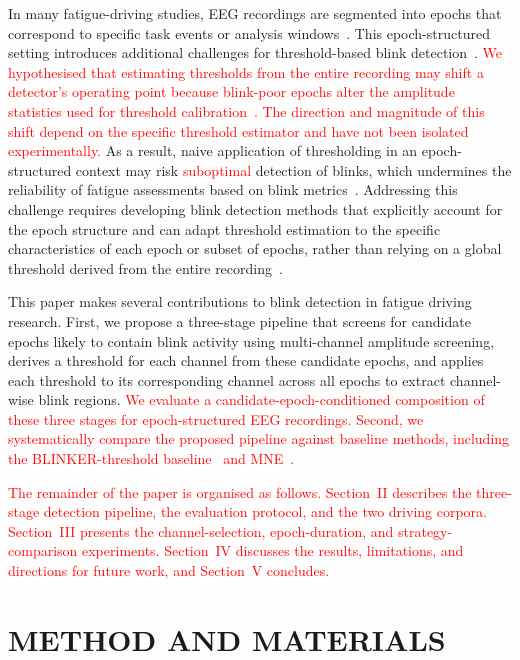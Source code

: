 \documentclass[journal,twoside,web]{ieeecolor}
\newcommand{\rev}[1]{\textcolor{red}{#1}}
\begin{document}
 
%
In many fatigue-driving studies, EEG recordings are segmented into epochs that correspond to specific task events or analysis windows~\citep{cao2019multichannel}. This epoch-structured setting introduces additional challenges for threshold-based blink detection~\citep{tran2021detection,jefri2022eye}.
%
\rev{We hypothesised that estimating thresholds from the entire recording may shift a detector's operating point because blink-poor epochs alter the amplitude statistics used for threshold calibration~\citep{klein2013reliable,guttmann2019new}. The direction and magnitude of this shift depend on the specific threshold estimator and have not been isolated experimentally.} As a result, naive application of thresholding in an epoch-structured context may risk \rev{suboptimal} detection of blinks, which undermines the reliability of fatigue assessments based on blink metrics~\citep{ko2020eyeblink,shahbakhti2023fusion}. Addressing this challenge requires developing blink detection methods that explicitly account for the epoch structure and can adapt threshold estimation to the specific characteristics of each epoch or subset of epochs, rather than relying on a global threshold derived from the entire recording~\citep{guttmann2019new,agarwal2019blink}.
 
%

%

This paper makes several contributions to blink detection in fatigue driving research. First, we propose a three-stage pipeline that screens for candidate epochs likely to contain blink activity using multi-channel amplitude screening, derives a threshold for each channel from these candidate epochs, and applies each threshold to its corresponding channel across all epochs to extract channel-wise blink regions.
%
\rev{We evaluate a candidate-epoch-conditioned composition of these three stages for epoch-structured EEG recordings.}
%
\rev{Second, we systematically compare the proposed pipeline against baseline methods, including the BLINKER-threshold baseline~\citep{kleifges2017blinker} and MNE~\citep{GramfortEtAl2013a}.}
%
%

%
\rev{The remainder of the paper is organised as follows. Section~II describes the three-stage detection pipeline, the evaluation protocol, and the two driving corpora. Section~III presents the channel-selection, epoch-duration, and strategy-comparison experiments. Section~IV discusses the results, limitations, and directions for future work, and Section~V concludes.}
%
%
\section{METHOD AND MATERIALS}\label{sec:method}
%
\end{document}
